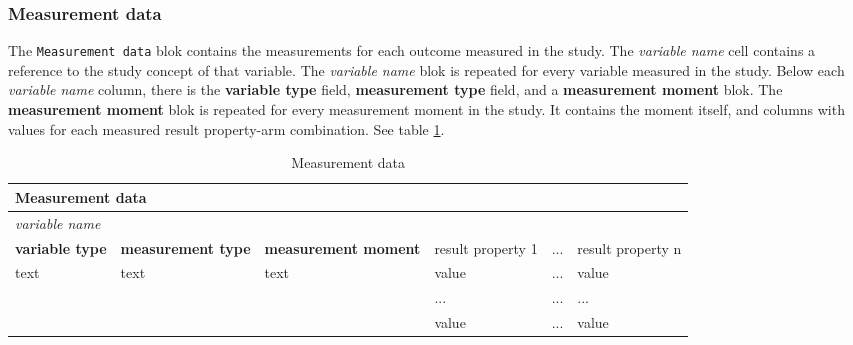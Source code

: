 \documentclass[a4paper,10pt]{article}
\begin{document}
\subsubsection*{Measurement data}
The \texttt{Measurement data} blok contains the measurements for each outcome measured in the study. The \textit{variable name} cell contains a reference to the study concept of that variable. The \textit{variable name} blok is repeated for every variable measured in the study. Below each \textit{variable name} column, there is the \textbf{variable type} field, \textbf{measurement type} field, and a \textbf{measurement moment} blok. The \textbf{measurement moment} blok is repeated for every measurement moment in the study. It contains the moment itself, and columns with values for each measured result property-arm combination.
See table \ref{table:Measurement data}.
\begin{table}[h]
  \centering
  \caption{Measurement data}
  \small
  \label{table:Measurement data}
  \begin{tabular}{|l|l|l|l|l|l|}
    \hline
    \multicolumn{6}{|l}{\textbf{Measurement data}}  \\ \hline
    \multicolumn{6}{|l|}{\textit{variable name}}    \\ \hline
    \textbf{variable type} &\textbf{ measurement type} & \textbf{measurement moment} & result property 1 &  ... & result property n \\ \hline
    text & text & text & value & ... & value        \\  \cline{4-6} 
         &      &      & ...   & ... & ...          \\  \cline{4-6} 
         &      &      & value & ... & value        \\ \hline
  \end{tabular}
\end{table}
\end{document}
